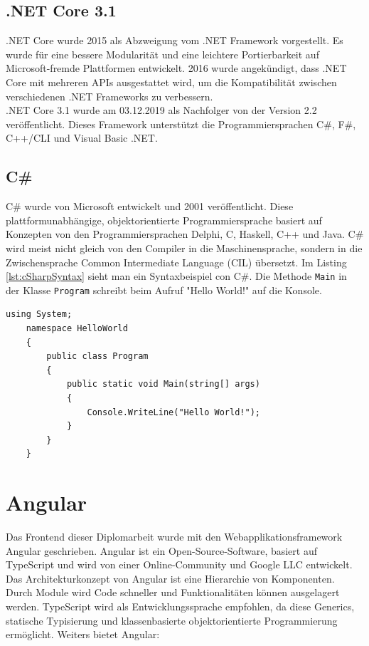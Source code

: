 \subsection{.NET Core 3.1}
.NET Core wurde 2015 als Abzweigung vom .NET Framework vorgestellt. Es wurde für eine bessere Modularität und eine leichtere Portierbarkeit auf Microsoft-fremde Plattformen entwickelt. 2016 wurde angekündigt, dass .NET Core mit mehreren APIs ausgestattet wird, um die Kompatibilität zwischen verschiedenen .NET Frameworks zu verbessern. \autocite{wikiDotnet} \\
.NET Core 3.1 wurde am 03.12.2019 als Nachfolger von der Version 2.2 veröffentlicht. Dieses Framework unterstützt die Programmiersprachen C\#, F\#, C++/CLI und Visual Basic .NET. \autocite{wikiDotnetCore}

\subsection{C\#}
C\# wurde von Microsoft entwickelt und 2001 veröffentlicht. Diese plattformunabhängige, objektorientierte Programmiersprache basiert auf Konzepten von den Programmiersprachen Delphi, C, Haskell, C++ und Java.
C\# wird meist nicht gleich von den Compiler in die Maschinensprache, sondern in die Zwischensprache Common Intermediate Language (CIL) übersetzt. Im Listing \ref{lst:cSharpSyntax} sieht man ein Syntaxbeispiel con C\#. Die Methode \texttt{Main} in der Klasse \texttt{Program} schreibt beim Aufruf "Hello World!" auf die Konsole. \autocite{wikiCSharp}

\begin{lstlisting}[caption={C\#-Syntaxbeispiel}, language={[Sharp]C},label={lst:cSharpSyntax}]
	using System;
	namespace HelloWorld
	{
		public class Program
		{
			public static void Main(string[] args)
			{
				Console.WriteLine("Hello World!");
			}
		}
	}
\end{lstlisting}
\section{Angular}
Das Frontend dieser Diplomarbeit wurde mit den Webapplikationsframework Angular geschrieben. Angular ist ein Open-Source-Software, basiert auf TypeScript und wird von einer Online-Community und Google LLC entwickelt.\\
Das Architekturkonzept von Angular ist eine Hierarchie von Komponenten. Durch Module wird Code schneller und Funktionalitäten können ausgelagert werden. TypeScript wird als Entwicklungssprache empfohlen, da diese Generics, statische Typisierung und klassenbasierte objektorientierte Programmierung ermöglicht. \autocite{wikiAngular}
Weiters bietet Angular:

